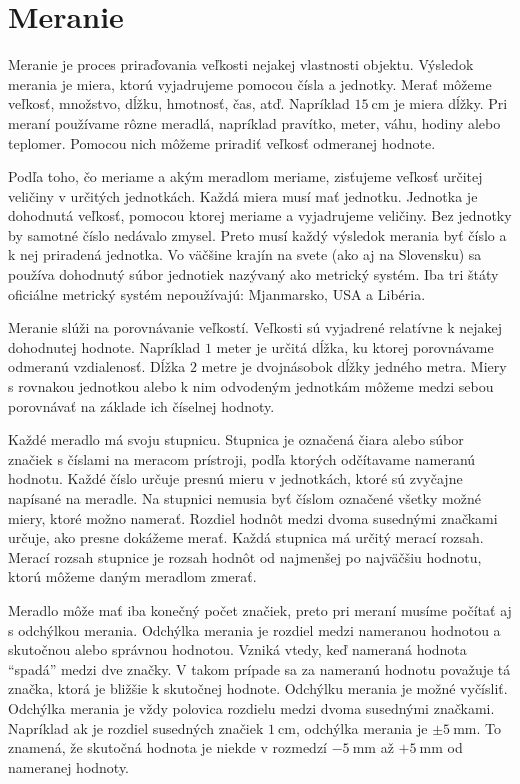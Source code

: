 \documentclass{report}
\begin{document}
\section{Meranie}

Meranie je proces priraďovania veľkosti nejakej vlastnosti objektu. Výsledok merania je miera, ktorú vyjadrujeme pomocou čísla a jednotky. Merať môžeme veľkosť, množstvo, dĺžku, hmotnosť, čas, atď. Napríklad \(\SI{15}{\cm}\) je miera dĺžky. Pri meraní používame rôzne meradlá, napríklad pravítko, meter, váhu, hodiny alebo teplomer. Pomocou nich môžeme priradiť veľkosť odmeranej hodnote.

Podľa toho, čo meriame a akým meradlom meriame, zisťujeme veľkosť určitej veličiny v určitých jednotkách. Každá miera musí mať jednotku. Jednotka je dohodnutá veľkosť, pomocou ktorej meriame a vyjadrujeme veličiny. Bez jednotky by samotné číslo nedávalo zmysel. Preto musí každý výsledok merania byť číslo a k nej priradená jednotka. Vo väčšine krajín na svete (ako aj na Slovensku) sa používa dohodnutý súbor jednotiek nazývaný ako metrický systém. Iba tri štáty oficiálne metrický systém nepoužívajú: Mjanmarsko, USA a Libéria.

Meranie slúži na porovnávanie veľkostí. Veľkosti sú vyjadrené relatívne k nejakej dohodnutej hodnote. Napríklad \(1\) meter je určitá dĺžka, ku ktorej porovnávame odmeranú vzdialenosť. Dĺžka \(2\) metre je dvojnásobok dĺžky jedného metra. Miery s rovnakou jednotkou alebo k nim odvodeným jednotkám môžeme medzi sebou porovnávať na základe ich číselnej hodnoty.

Každé meradlo má svoju stupnicu. Stupnica je označená čiara alebo súbor značiek s číslami na meracom prístroji, podľa ktorých odčítavame nameranú hodnotu. Každé číslo určuje presnú mieru v jednotkách, ktoré sú zvyčajne napísané na meradle. Na stupnici nemusia byť číslom označené všetky možné miery, ktoré možno namerať. Rozdiel hodnôt medzi dvoma susednými značkami určuje, ako presne dokážeme merať. Každá stupnica má určitý merací rozsah. Merací rozsah stupnice je rozsah hodnôt od najmenšej po najväčšiu hodnotu, ktorú môžeme daným meradlom zmerať.

Meradlo môže mať iba konečný počet značiek, preto pri meraní musíme počítať aj s odchýlkou merania. Odchýlka merania je rozdiel medzi nameranou hodnotou a skutočnou alebo správnou hodnotou. Vzniká vtedy, keď nameraná hodnota \enquote{spadá} medzi dve značky. V takom prípade sa za nameranú hodnotu považuje tá značka, ktorá je bližšie k skutočnej hodnote. Odchýlku merania je možné vyčísliť. Odchýlka merania je vždy polovica rozdielu medzi dvoma susednými značkami. Napríklad ak je rozdiel susedných značiek \(\SI{1}{\cm}\), odchýlka merania je \(\pm \SI{5}{\mm}\). To znamená, že skutočná hodnota je niekde v rozmedzí \(-\SI{5}{\mm}\) až \(+\SI{5}{\mm}\) od nameranej hodnoty.
\end{document}
